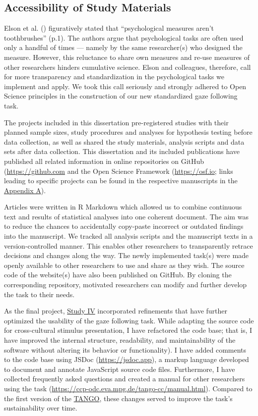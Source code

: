 \documentclass[
]{scrbook}
\begin{document}
\subsection{Accessibility of Study Materials}\label{accesibility}

Elson et al. () figuratively stated that ``psychological measures aren't toothbrushes'' (p.1). The authors argue that psychological tasks are often used only a handful of times --- namely by the same researcher(s) who designed the measure. However, this reluctance to share own measures and re-use measures of other researchers hinders cumulative science. Elson and colleagues, therefore, call for more transparency and standardization in the psychological tasks we implement and apply. We took this call seriously and strongly adhered to Open Science principles in the construction of our new standardized gaze following task.

The projects included in this dissertation pre-registered studies with their planned sample sizes, study procedures and analyses for hypothesis testing before data collection, as well as shared the study materials, analysis scripts and data sets after data collection. This dissertation and its included publications have published all related information in online repositories on GitHub (\mbox{\url{https://github.com}} and the Open Science Framework (\mbox{\url{https://osf.io}}; links leading to specific projects can be found in the respective manuscripts in the \hyperref[appendixA]{Appendix A}).

Articles were written in R Markdown which allowed us to combine continuous text and results of statistical analyses into one coherent document. The aim was to reduce the chances to accidentally copy-paste incorrect or outdated findings into the manuscript. We tracked all analysis scripts and the manuscript texts in a version-controlled manner. This enables other researchers to transparently retrace decisions and changes along the way. The newly implemented task(s) were made openly available to other researchers to use and share as they wish. The source code of the website(s) have also been published on GitHub. By cloning the corresponding repository, motivated researchers can modify and further develop the task to their needs.

As the final project, \hyperref[studyIV]{Study IV} incorporated refinements that have further optimized the usability of the gaze following task. While adapting the source code for cross-cultural stimulus presentation, I have refactored the code base; that is, I have improved the internal structure, readability, and maintainability of the software without altering its behavior or functionality). I have added comments to the code base using JSDoc (\mbox{\url{https://jsdoc.app}}), a markup language developed to document and annotate JavaScript source code files. Furthermore, I have collected frequently asked questions and created a manual for other researchers using the task (\mbox{\url{https://ccp-odc.eva.mpg.de/tango-cc/manual.html}}). Compared to the first version of the \hyperref[acronyms_TANGO]{TANGO}, these changes served to improve the task's sustainability over time.
\end{document}
